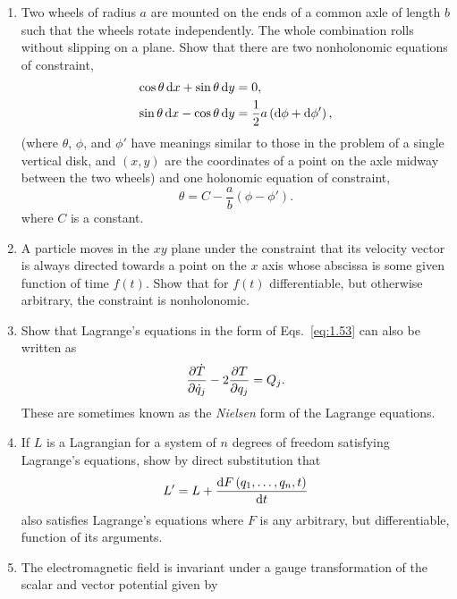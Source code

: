 \begin{enumerate}
    \item Two wheels of radius \(a\) are mounted on the ends of a common axle of length \(b\) such that the wheels rotate independently. The whole combination rolls without slipping on a plane. Show that there are two nonholonomic equations of constraint,
    \begin{equation*}
        \begin{aligned}
            \cos\theta\odif{x}+\sin\theta\odif{y}&=0,\\
            \sin\theta\odif{x}-\cos\theta\odif{y}&=\frac{1}{2}a\left(\odif{\phi}+\odif{\phi'}\right),
        \end{aligned}
    \end{equation*}
    (where \(\theta\), \(\phi\), and \(\phi'\) have meanings similar to those in the problem of a single vertical disk, and \(\left(x,y\right)\) are the coordinates of a point on the axle midway between the two wheels) and one holonomic equation of constraint,
    \begin{equation*}
        \theta=C-\frac{a}{b}\left(\phi-\phi'\right).
    \end{equation*}
    where \(C\) is a constant.
    \item A particle moves in the \(xy\) plane under the constraint that its velocity vector is always directed towards a point on the \(x\) axis whose abscissa is some given function of time \(f\left(t\right)\). Show that for \(f\left(t\right)\) differentiable, but otherwise arbitrary, the constraint is nonholonomic.
    \item Show that Lagrange's equations in the form of Eqs.~\eqref{eq:1.53} can also be written as
    \begin{equation*}
        \pdv{\dot{T}}{\dot{q}_j}-2\pdv{T}{q_j}=Q_j.
    \end{equation*}
    These are sometimes known as the \emph{Nielsen} form of the Lagrange equations.
    \item\label{derivation:1.8} If \(L\) is a Lagrangian for a system of \(n\) degrees of freedom satisfying Lagrange's equations, show by direct substitution that
    \begin{equation*}
        L'=L+\odv{F\left(q_1,\ldots,q_n,t\right)}{t}
    \end{equation*}
    also satisfies Lagrange's equations where \(F\) is any arbitrary, but differentiable, function of its arguments.
    \item The electromagnetic field is invariant under a gauge transformation of the scalar and vector potential given by

\end{enumerate}
